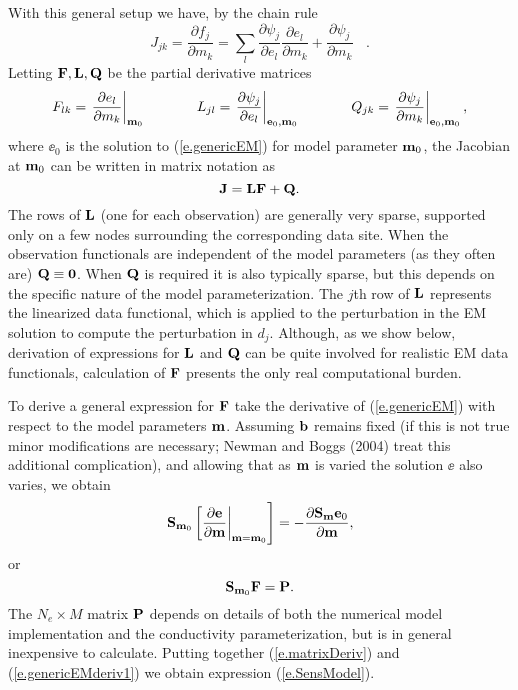 With this general setup we have, by the chain rule
\begin{equation}
\label{e.genericDeriv}
J_{jk} = \frac{\partial f_j}{\partial m_k} =
\sum_l \frac {\partial \psi_j}{\partial e_l}
\frac{\partial e_l}{\partial m_k} +
\frac{\partial \psi_j}{\partial m_k} ~~~~ .
\end{equation}
Letting ${{\bf F} , {\bf L} , {\bf Q}}$ be the partial derivative matrices
\begin{equation}
\label{e.LL_QQ}
F_{lk} = \left. \frac{\partial e_l}{\partial m_k} 
\right |_{{\bf m}_0}
\,\,\,\,\,\,\,\,\,\,\,\,\,\,\,\,\,\,\,\,\,\,
L_{jl} = \left. \frac{\partial \psi_j}{\partial e_l} 
\right |_{{\bf e}_0,{\bf m}_0}
\,\,\,\,\,\,\,\,\,\,\,\,\,\,\,\,\,\,\,\,\,\,
Q_{jk} = \left. \frac{\partial \psi_j}{\partial m_k} 
\right |_{{\bf e}_0,{\bf m}_0},
\end{equation}
where $\ee_0$ is the solution to (\ref{e.genericEM})
for model parameter ${\bf m}_0$,
the Jacobian at ${\bf m}_0$ can be written in matrix notation as
\begin{equation}
\label{e.matrixDeriv}
{\bf J} = {\bf L} {\bf F}  + {\bf Q}  .
\end{equation}
The rows of ${\bf L}$
(one for each observation) are generally very sparse, supported only on
a few nodes surrounding the corresponding data site.
When the observation functionals
are independent of the model parameters
(as they often are) ${\bf Q} \equiv \bf 0$.
When ${\bf Q}$ is required it is also typically sparse,
but this depends on the specific nature of the model parameterization.
The $j$th row of ${\bf L}$ represents
the linearized data functional, which is applied to the perturbation
in the EM solution to compute the perturbation in $d_j$.
Although, as we show below,
derivation of expressions for ${\bf L}$ and ${\bf Q}$ can be quite involved for
realistic EM data functionals,
calculation of ${\bf F}$ presents the only
real computational burden.

To derive a general expression for ${\bf F}$ take the derivative
of (\ref{e.genericEM}) with respect to the model parameters ${\bf m}$.
Assuming ${\bf b}$ remains fixed (if this is not true minor modifications
are necessary; Newman and Boggs (2004) treat this additional
complication), and allowing that as ${\bf m}$ is varied
the solution $\ee$ also varies, we obtain
\begin{equation}
\label{e.genericEMderiv}
\left. {\bf S}_{{\bf m}_0} \left [ \frac{\partial {\bf e}}{\partial {\bf m}}
\right |_{{\bf m} = {\bf m}_0} \right]
= - \frac{\partial {\bf S}_{{\bf m}}
{\bf e}_0}{\partial {\bf m}},
\end{equation}
or
\begin{equation}
\label{e.genericEMderiv1}
{\bf S}_{{\bf m}_0} {\bf F} = {\bf P} .
\end{equation}
The $N_e \times M$ matrix ${\bf P}$ depends on details
of both the numerical model implementation and the conductivity
parameterization, but is in general inexpensive to calculate.
Putting together (\ref{e.matrixDeriv}) and (\ref{e.genericEMderiv1})
we obtain expression (\ref{e.SensModel}).

